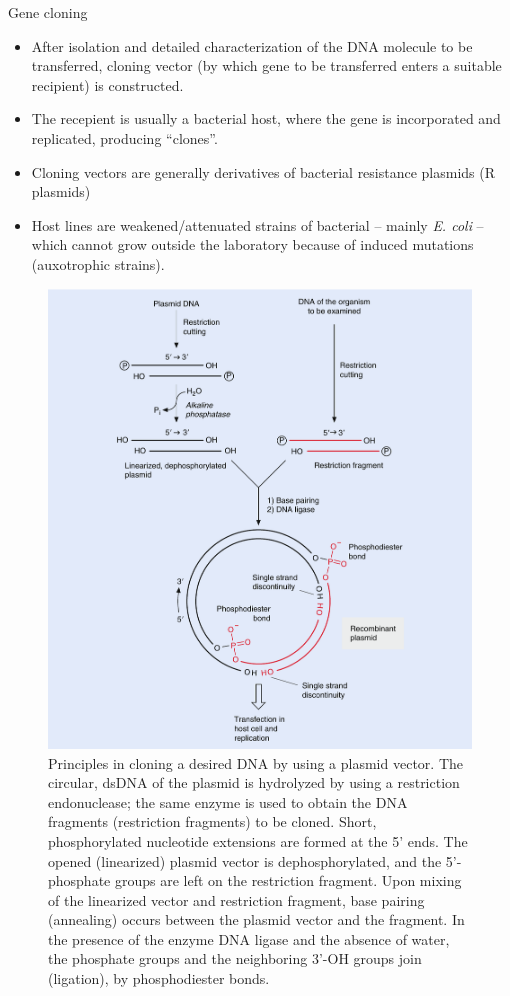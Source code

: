 \documentclass[
  ignorenonframetext,
  aspectratio=169]{beamer}
\providecommand{\tightlist}{%
  \setlength{\itemsep}{0pt}\setlength{\parskip}{0pt}}
\begin{document}
\begin{frame}{Gene cloning}
\protect\hypertarget{gene-cloning}{}
\begin{itemize}
\tightlist
\item
  After isolation and detailed characterization of the DNA molecule to
  be transferred, cloning vector (by which gene to be transferred enters
  a suitable recipient) is constructed.
\item
  The recepient is usually a bacterial host, where the gene is
  incorporated and replicated, producing ``clones''.
\item
  Cloning vectors are generally derivatives of bacterial resistance
  plasmids (R plasmids)
\item
  Host lines are weakened/attenuated strains of bacterial -- mainly
  \emph{E. coli} -- which cannot grow outside the laboratory because of
  induced mutations (auxotrophic strains).
\end{itemize}
\end{frame}

\begin{frame}{}
\protect\hypertarget{section-2}{}
\begin{figure}
\includegraphics[width=0.4\linewidth]{../images/DNA_cloning} \caption{Principles in cloning a desired DNA by using a plasmid vector. The circular, dsDNA of the plasmid is hydrolyzed by using a restriction endonuclease; the same enzyme is used to obtain the DNA fragments (restriction fragments) to be cloned. Short, phosphorylated nucleotide extensions are formed at the 5' ends. The opened (linearized) plasmid vector is dephosphorylated, and the 5'-phosphate groups are left on the restriction fragment. Upon mixing of the linearized vector and restriction fragment, base pairing (annealing) occurs between the plasmid vector and the fragment. In the presence of the enzyme DNA ligase and the absence of water, the phosphate groups and the neighboring 3'-OH groups join (ligation), by phosphodiester bonds.}\label{fig:dna-cloning}
\end{figure}
\end{frame}
\end{document}
